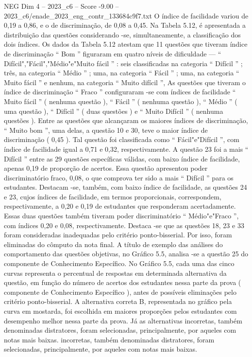 \begin{textsample}{NEG Dim 4 – 2023\_c6 – Score -9.00 – 2023\_c6/enade\_2023\_eng\_contr\_133684c9f7.txt}
O índice de facilidade variou de 0,19 a 0,86, e o de discriminação, de 0,08 a 0,45.
Na Tabela 5.12, é apresentada a distribuição das questões considerando -se, simultaneamente, a classificação dos dois índices.
Os dados da Tabela 5.12 atestam que 11 questões que tiveram índice de discriminação “ Bom ” figuraram em quatro níveis de dificuldade — “ Difícil","Fácil","Médio"e"Muito fácil ” : seis classificadas na categoria “ Difícil ” ; três, na categoria “ Médio ” ; uma, na categoria “ Fácil ” ; uma, na categoria “ Muito fácil ” e nenhum, na categoria “ Muito difícil ”, As questões que tiveram o índice de discriminação “ Fraco ” configuraram -se com índices de facilidade “ Muito fácil ” ( nenhuma questão ), “ Fácil ” ( nenhuma questão ), “ Médio ” ( uma questão ), “ Difícil ” ( duas questões ) e “ Muito Difícil ” ( nenhuma questões ).
Entre as questões que alcançaram os maiores índices de discriminação, “ Muito bom ”, uma delas, a questão 10 e 30, teve o maior índice de discriminação ( 0,45 ).
Tal questão foi classificada como “ Fácil"e"Difícil ”, com índice de facilidade igual a 0,71 e 0,32, respectivamente.
A questão 23 foi a mais “ Difícil ” entre as 29 questões específicas válidas, com baixo índice de facilidade, apenas 0,19 de proporção de acertos.
Essa questão apresentou poder discriminatório fraco, 0,08, o que comprova ter sido a mais “ Difícil ” para os estudantes.
Destacam -se, também, com baixo índice de facilidade, as questões 24 e 23, cujos índices de facilidade, em termos proporcionais, correspondem, respectivamente, a 0,20 e 0,19 de estudantes que responderam acertadamente.
Essas duas questões também tiveram poder discriminatório “ Médio"e"Fraco ”, com índices 0,20 e 0,08, respectivamente.
Destaca -se que as questões 18, 23 e 33 foram consideradas inadequadas pelo critério ponto-bisserial.
Por isso, foram eliminadas do cômputo da nota final.
A título de exemplo das análises do comportamento das questões objetivas, no Gráfico 5.5, analisa -se a questão 25 do componente de Conhecimento Específico.
No Gráfico 5.5, cada uma das cinco curvas representa o percentual de respostas em determinada alternativa da questão, em função do número de acertos dos estudantes nessa parte da prova ( componente de Conhecimento Específico ), antes de possíveis eliminações pelo critério ponto-bisserial.
A alternativa correta B, representada no gráfico pela curva em mostarda, foi escolhida em maiores proporções pelos estudantes com desempenho melhor nessa parte da prova.
Já as alternativas incorretas, também denominadas distratores, foram selecionadas, principalmente, por aqueles com notas mais baixas. incorretas, também denominadas distratores, foram selecionadas, principalmente, por aqueles com notas mais baixas.

\end{textsample}
